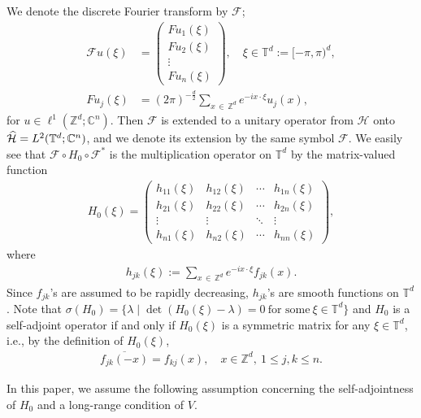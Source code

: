 \documentclass[10pt]{amsart}
\theoremstyle{definition}\newtheorem{defi}[theo]{Definition}\newtheorem{rema}[theo]{Remark}\newtheorem{exam}[theo]{Example}\newtheorem{exem}[theo]{Example}\newtheorem{nota}[theo]{Notation}
\newcommand{\x}{\xi}
\newcommand{\C}{\mathbb{C}}
\newcommand{\Z}{\mathbb{Z}}
\newcommand{\T}{\mathbb{T}}
\newcommand{\HS}{\mathcal{H}}
\newcommand{\FS}{\mathcal{F}}
\let\oldhat\hat
\renewcommand*{\hat}[1]{\mathchoice{\widehat{#1}}{\widehat{#1}}{\oldhat{#1}}{\oldhat{#1}}}
\begin{document}
We denote the discrete Fourier transform by $\FS$;
\begin{align*}
\FS u(\xi) &=
\begin{pmatrix}
Fu_1(\xi) \\
Fu_2(\xi) \\
\vdots \\
Fu_n(\xi)
\end{pmatrix}, \quad \xi \in \T^d:=[-\pi,\pi)^d, \\
F u_j(\x) &= (2\pi)^{-\frac{d}{2}}\sum_{x\,\in\,\Z^d}e^{-ix\cdot\x}u_j(x),
\end{align*}
for $u\in \ell^1(\Z^d;\C^n)$. Then $\FS$ is extended to a unitary operator from $\HS$ onto $\hat{\HS}=L^2(\T^d; \C^n)$, and we denote its extension by the same symbol $\FS$. We easily see that $\FS \circ H_0 \circ \FS^*$ is the multiplication operator on $\T^d$ by the matrix-valued function
\begin{align*}
H_0(\xi) = 
\begin{pmatrix}
h_{11}(\xi) & h_{12}(\xi) & \cdots & h_{1n}(\xi) \\
h_{21}(\xi) & h_{22}(\xi) & \cdots & h_{2n}(\xi) \\
\vdots & \vdots & \ddots & \vdots \\
h_{n1}(\xi) & h_{n2}(\xi) & \cdots & h_{nn}(\xi)
\end{pmatrix},
\end{align*}
where
\begin{align*}
h_{jk}(\xi):=\sum_{x\,\in\,\Z^d}e^{-ix\cdot\xi}f_{jk}(x).
\end{align*}
Since $f_{jk}$'s are assumed to be rapidly decreasing, $h_{jk}$'s are smooth functions on $\T^d$. Note that $\sigma(H_0) = \{ \lambda \mid \det (H_0(\xi)-\lambda) =0 \ \text{for some}\ \xi \in \T^d \} $ and $H_0$ is a self-adjoint operator if and only if $H_0(\x)$ is a symmetric matrix for any $\x\in\T^d$, i.e., by the definition of $H_0(\x)$,
\begin{align}\label{selfadj}
\overline{f_{jk}(-x)}=f_{kj}(x), \quad x \in \Z^d, \ 1 \leq j,k \leq n.
\end{align}


In this paper, we assume the following assumption concerning the self-adjointness of $H_0$ and a long-range condition of $V$.
\end{document}
